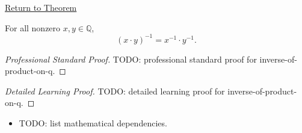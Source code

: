 \newpage
{}
\label{prf:inverse-of-product-on-q}

\begin{remark*}[Return]
\hyperref[cor:inverse-of-product-on-q]{Return to Theorem}
\end{remark*}

\begin{corollary*}
For all nonzero $x,y\in\mathbb{Q}$,
\[
(x\cdot y)^{-1}=x^{-1}\cdot y^{-1}.
\]
\end{corollary*}

\begin{proof}[Professional Standard Proof]
\LRAProofBodyStart
TODO: professional standard proof for inverse-of-product-on-q.
\end{proof}

\begin{proof}[Detailed Learning Proof]
\LRAProofBodyStart
TODO: detailed learning proof for inverse-of-product-on-q.
\end{proof}

\begin{remark*}
\end{remark*}

\begin{dependencies}
\begin{itemize}
  \item TODO: list mathematical dependencies.
\end{itemize}
\end{dependencies}

\clearpage
